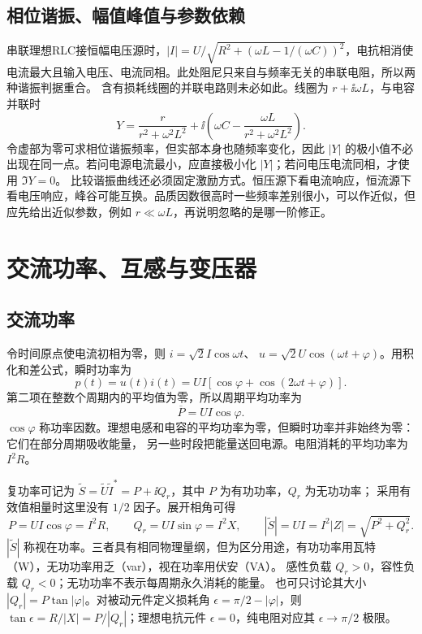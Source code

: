 \subsection{相位谐振、幅值峰值与参数依赖}
串联理想RLC接恒幅电压源时，$|I|=U/\sqrt{R^2+(\omega L-1/(\omega C))^2}$，电抗相消使电流最大且输入电压、电流同相。此处阻尼只来自与频率无关的串联电阻，所以两种谐振判据重合。
含有损耗线圈的并联电路则未必如此。线圈为 $r+\ii\omega L$，与电容并联时
\[
 Y=\frac{r}{r^2+\omega^2L^2}
 +\ii\left(\omega C-\frac{\omega L}{r^2+\omega^2L^2}\right).
\]
令虚部为零可求相位谐振频率，但实部本身也随频率变化，因此 $|Y|$ 的极小值不必出现在同一点。若问电源电流最小，应直接极小化 $|Y|$；若问电压电流同相，才使用 $\Im Y=0$。
比较谐振曲线还必须固定激励方式。恒压源下看电流响应，恒流源下看电压响应，峰谷可能互换。品质因数很高时一些频率差别很小，可以作近似，但应先给出近似参数，例如 $r\ll\omega L$，再说明忽略的是哪一阶修正。



\section{交流功率、互感与变压器}

\subsection{交流功率}


令时间原点使电流初相为零，则 $i=\sqrt2 I\cos\omega t$、
$u=\sqrt2 U\cos(\omega t+\varphi)$。用积化和差公式，瞬时功率为
\begin{equation}
 p(t)=u(t)i(t)=UI[\cos\varphi+\cos(2\omega t+\varphi)].
\end{equation}
第二项在整数个周期内的平均值为零，所以周期平均功率为
\begin{equation}
 \overline P=UI\cos\varphi.
\end{equation}
$\cos\varphi$ 称功率因数。理想电感和电容的平均功率为零，但瞬时功率并非始终为零：它们在部分周期吸收能量，
另一些时段把能量送回电源。电阻消耗的平均功率为 $I^2R$。

复功率可记为 $\widetilde S=\widetilde U\widetilde I^*=P+\ii Q_r$，其中 $P$ 为有功功率，$Q_r$ 为无功功率；
采用有效值相量时这里没有 $1/2$ 因子。展开相角可得
\begin{equation}
 P=UI\cos\varphi=I^2R,\qquad Q_r=UI\sin\varphi=I^2X,
 \qquad |\widetilde S|=UI=I^2|Z|=\sqrt{P^2+Q_r^2}.
\end{equation}
$|\widetilde S|$ 称视在功率。三者具有相同物理量纲，但为区分用途，有功功率用瓦特（W），无功功率用乏（var），视在功率用伏安（VA）。
感性负载 $Q_r>0$，容性负载 $Q_r<0$；无功功率不表示每周期永久消耗的能量。
也可只讨论其大小 $|Q_r|=P\tan|\varphi|$。对被动元件定义损耗角
$\epsilon=\pi/2-|\varphi|$，则 $\tan\epsilon=R/|X|=P/|Q_r|$；理想电抗元件 $\epsilon=0$，纯电阻对应其 $\epsilon\to\pi/2$ 极限。



